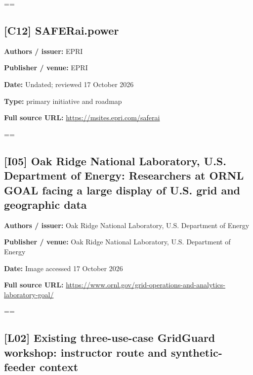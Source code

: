 \documentclass[10pt,letterpaper]{article}
\begin{document}
\egroup\par\noindent\box\readingEntry\par\medskip
\setbox\readingEntry=\vbox\bgroup\hsize=\linewidth\subsection*{[C12] SAFERai.power}
\textbf{Authors / issuer:} EPRI\par
\textbf{Publisher / venue:} EPRI\par
\textbf{Date:} Undated; reviewed 17 October 2026\par
\textbf{Type:} primary initiative and roadmap\par
\textbf{Full source URL:} \href{https://msites.epri.com/saferai}{\small\ttfamily https:/\allowbreak{}/\allowbreak{}msites.\allowbreak{}epri.\allowbreak{}com/\allowbreak{}saferai}\par
\egroup\par\noindent\box\readingEntry\par\medskip
\setbox\readingEntry=\vbox\bgroup\hsize=\linewidth\subsection*{[I05] Oak Ridge National Laboratory, U.S. Department of Energy: Researchers at ORNL GOAL facing a large display of U.S. grid and geographic data}
\textbf{Authors / issuer:} Oak Ridge National Laboratory, U.S. Department of Energy\par
\textbf{Publisher / venue:} Oak Ridge National Laboratory, U.S. Department of Energy\par
\textbf{Date:} Image accessed 17 October 2026\par
\textbf{Full source URL:} \href{https://www.ornl.gov/grid-operations-and-analytics-laboratory-goal/}{\small\ttfamily https:/\allowbreak{}/\allowbreak{}www.\allowbreak{}ornl.\allowbreak{}gov/\allowbreak{}grid-\allowbreak{}operations-\allowbreak{}and-\allowbreak{}analytics-\allowbreak{}laboratory-\allowbreak{}goal/\allowbreak{}}\par
\egroup\par\noindent\box\readingEntry\par\medskip
\setbox\readingEntry=\vbox\bgroup\hsize=\linewidth\subsection*{[L02] Existing three-use-case GridGuard workshop: instructor route and synthetic-feeder context}
\end{document}
